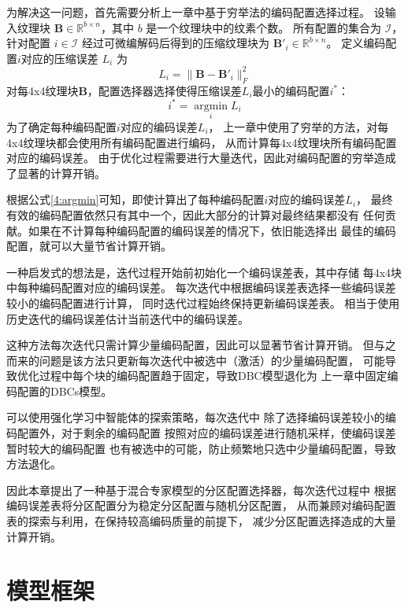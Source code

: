 为解决这一问题，首先需要分析上一章中基于穷举法的编码配置选择过程。
设输入纹理块 $\mathbf{B}\in\mathbb{R}^{b\times n}$，其中 $b$ 是一个纹理块中的纹素个数。
所有配置的集合为 $\mathcal{I}$，针对配置 $i\in\mathcal{I}$ 经过可微编解码后得到的压缩纹理块为 $\mathbf{B}'_i\in\mathbb{R}^{b\times n}$。
定义编码配置$i$对应的压缩误差 $L_i$ 为
\begin{equation}
L_i=\|\mathbf{B}-\mathbf{B}'_i\|_F^2
\end{equation}
对每4x4纹理块$\mathbf{B}$，配置选择器选择使得压缩误差$L_i$最小的编码配置$i^*$：
\begin{equation}
    \label{4:argmin}
    i^*=\mathop{\arg\min}\limits_{i} L_i
\end{equation}
为了确定每种编码配置$i$对应的编码误差$L_i$，
上一章中使用了穷举的方法，对每4x4纹理块都会使用所有编码配置进行编码，
从而计算每4x4纹理块所有编码配置对应的编码误差。
由于优化过程需要进行大量迭代，因此对编码配置的穷举造成了显著的计算开销。

根据公式\ref{4:argmin}可知，即使计算出了每种编码配置$i$对应的编码误差$L_i$，
最终有效的编码配置依然只有其中一个，因此大部分的计算对最终结果都没有
任何贡献。如果在不计算每种编码配置的编码误差的情况下，依旧能选择出
最佳的编码配置，就可以大量节省计算开销。

一种启发式的想法是，迭代过程开始前初始化一个编码误差表，其中存储
每4x4块中每种编码配置对应的编码误差。
每次迭代中根据编码误差表选择一些编码误差较小的编码配置进行计算，
同时迭代过程始终保持更新编码误差表。
相当于使用历史迭代的编码误差估计当前迭代中的编码误差。

这种方法每次迭代只需计算少量编码配置，因此可以显著节省计算开销。
但与之而来的问题是该方法只更新每次迭代中被选中（激活）的少量编码配置，
可能导致优化过程中每个块的编码配置趋于固定，导致DBC模型退化为
上一章中固定编码配置的DBCs模型。

可以使用强化学习中智能体的探索策略，每次迭代中
除了选择编码误差较小的编码配置外，对于剩余的编码配置
按照对应的编码误差进行随机采样，使编码误差暂时较大的编码配置
也有被选中的可能，防止频繁地只选中少量编码配置，导致方法退化。

因此本章提出了一种基于混合专家模型的分区配置选择器，每次迭代过程中
根据编码误差表将分区配置分为稳定分区配置与随机分区配置，
从而兼顾对编码配置表的探索与利用，在保持较高编码质量的前提下，
减少分区配置选择造成的大量计算开销。

\section{模型框架}

